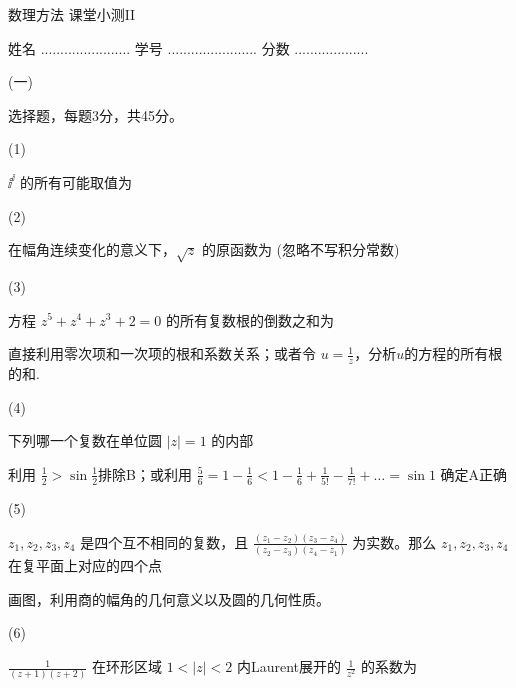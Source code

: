 \documentclass[12pt,CJK]{article}
\begin{document}
\bch
{\large 数理方法 课堂小测II}

{\vskip 0.25in}

姓名 ....................... {\hskip 0.5in}    学号 .......................{\hskip 0.5in}  分数 ...................

{\vskip 0.1in}

\bitem
\item[(一)]{选择题，每题3分，共45分。

  \bitem

\item[(1)]{ $\ii^\ii$ 的所有可能取值为 

}

\item[(2)]{在幅角连续变化的意义下，$\sqrt{z}$ 的原函数为 (忽略不写积分常数) 

  }
  

\item[(3)]{方程 $z^5 + z^4  + z^3+ 2=0$ 的所有复数根的倒数之和为 


  {\small \red 直接利用零次项和一次项的根和系数关系；或者令 $u=\frac{1}{z}$，分析$u$的方程的所有根的和.}
}


\item[(4)]{下列哪一个复数在单位圆 $|z|=1$ 的内部 


  {\small \red 利用 $\frac{1}{2}>\sin\frac{1}{2}$排除B；或利用 $\frac{5}{6} = 1-\frac{1}{6} < 1-\frac{1}{6}+\frac{1}{5!}-\frac{1}{7!}+\ldots = \sin 1$ 确定A正确}
  }
  
  
\item[(5)]{$z_1,z_2,z_3,z_4$ 是四个互不相同的复数，且 $\frac{(z_1-z_2)(z_3-z_4)}{(z_2-z_3)(z_4-z_1)}$ 为实数。那么 $z_1,z_2,z_3,z_4$ 在复平面上对应的四个点 


  {\small \red 画图，利用商的幅角的几何意义以及圆的几何性质。}
}

\item[(6)]{ $\frac{1}{(z+1)(z+2)}$ 在环形区域 $1<|z|<2$ 内Laurent展开的 $\frac{1}{z^2}$ 的系数为 

}}
\end{document}
